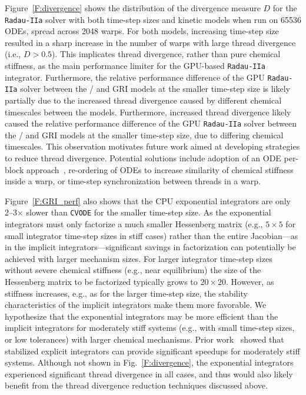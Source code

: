 \documentclass[preprint]{elsarticle}
\begin{document}
Figure~\ref{F:divergence} shows the distribution of the divergence measure $D$ for the \texttt{Radau-IIa} solver with both time-step sizes and kinetic models when run on \num{65536} ODEs, spread across \num{2048} warps.
For both models, increasing time-step size resulted in a sharp increase in the number of warps with large thread divergence (i.e., $D > 0.5$).
This implicates thread divergence, rather than pure chemical stiffness, as the main performance limiter for the GPU-based \texttt{Radau-IIa} integrator.
Furthermore, the relative performance difference of the GPU \texttt{Radau-IIa} solver between the \slash{} and GRI models at the smaller time-step size is likely partially due to the increased thread divergence caused by different chemical timescales between the models.
Furthermore, increased thread divergence likely caused the relative performance difference of the GPU \texttt{Radau-IIa} solver between the \slash{} and GRI models at the smaller time-step size, due to differing chemical timescales.
This observation motivates future work aimed at developing strategies to reduce thread divergence.
Potential solutions include adoption of an ODE per-block approach~\cite{Stone:2013aa}, re-ordering of ODEs to increase similarity of chemical stiffness inside a warp, or time-step synchronization between threads in a warp.

Figure~\ref{F:GRI_perf} also shows that the CPU exponential integrators are only \numrange{2}{3}$\times$ slower than \texttt{CVODE} for the smaller time-step size.
As the exponential integrators must only factorize a much smaller Hessenberg matrix (e.g., $5\times 5$ for small integrator time-step sizes in stiff cases) rather than the entire Jacobian---as in the implicit integrators---significant savings in factorization can potentially be achieved with larger mechanism sizes.
For larger integrator time-step sizes without severe chemical stiffness (e.g., near equilibrium) the size of the Hessenberg matrix to be factorized typically grows to $20\times 20$.
However, as stiffness increases, e.g., as for the larger time-step size, the stability characteristics of the implicit integrators make them more favorable.
We hypothesize that the exponential integrators may be more efficient than the implicit integrators for moderately stiff systems (e.g., with small time-step sizes, or low tolerances) with larger chemical mechanisms.
Prior work~\cite{Niemeyer:2014aa} showed that stabilized explicit integrators can provide significant speedups for moderately stiff systems.
Although not shown in Fig.~\ref{F:divergence}, the exponential integrators experienced significant thread divergence in all cases, and thus would also likely benefit from the thread divergence reduction techniques discussed above.
\end{document}
